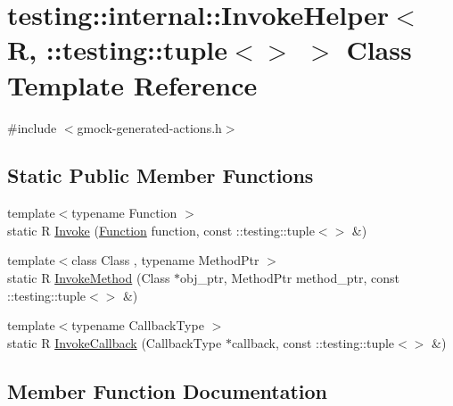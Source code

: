 \hypertarget{classtesting_1_1internal_1_1InvokeHelper_3_01R_00_01_1_1testing_1_1tuple_3_4_01_4}{}\section{testing\+::internal\+::Invoke\+Helper$<$ R, \+::testing\+::tuple$<$$>$ $>$ Class Template Reference}
\label{classtesting_1_1internal_1_1InvokeHelper_3_01R_00_01_1_1testing_1_1tuple_3_4_01_4}


{\ttfamily \#include $<$gmock-\/generated-\/actions.\+h$>$}

\subsection*{Static Public Member Functions}
\begin{DoxyCompactItemize}
\item 
{\footnotesize template$<$typename Function $>$ }\\static R \mbox{\hyperlink{classtesting_1_1internal_1_1InvokeHelper_3_01R_00_01_1_1testing_1_1tuple_3_4_01_4_a55e6218235e69a896d88a3076a2c6150}{Invoke}} (\mbox{\hyperlink{structtesting_1_1internal_1_1Function}{Function}} function, const \+::testing\+::tuple$<$$>$ \&)
\item 
{\footnotesize template$<$class Class , typename Method\+Ptr $>$ }\\static R \mbox{\hyperlink{classtesting_1_1internal_1_1InvokeHelper_3_01R_00_01_1_1testing_1_1tuple_3_4_01_4_a0368e26cbc1bcb12abbfb802f8294fa0}{Invoke\+Method}} (Class $\ast$obj\+\_\+ptr, Method\+Ptr method\+\_\+ptr, const \+::testing\+::tuple$<$$>$ \&)
\item 
{\footnotesize template$<$typename Callback\+Type $>$ }\\static R \mbox{\hyperlink{classtesting_1_1internal_1_1InvokeHelper_3_01R_00_01_1_1testing_1_1tuple_3_4_01_4_a9d81d455ebad0e8bf02a7d04c07ccb20}{Invoke\+Callback}} (Callback\+Type $\ast$callback, const \+::testing\+::tuple$<$$>$ \&)
\end{DoxyCompactItemize}


\subsection{Member Function Documentation}
\mbox{\label{classtesting_1_1internal_1_1InvokeHelper_3_01R_00_01_1_1testing_1_1tuple_3_4_01_4_a55e6218235e69a896d88a3076a2c6150}} 
